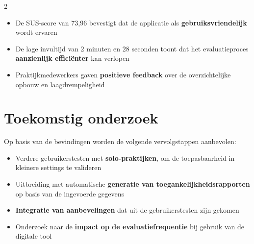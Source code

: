 \documentclass[a0,portrait]{hogent-poster}
\begin{document}
\begin{multicols}{2}
\begin{itemize}
  \item De SUS-score van 73,96 bevestigt dat de applicatie als \textbf{gebruiksvriendelijk} wordt ervaren
  \item De lage invultijd van 2 minuten en 28 seconden toont dat het evaluatieproces \textbf{aanzienlijk efficiënter} kan verlopen
  \item Praktijkmedewerkers gaven \textbf{positieve feedback} over de overzichtelijke opbouw en laagdrempeligheid
\end{itemize}

\section{Toekomstig onderzoek}

Op basis van de bevindingen worden de volgende vervolgstappen aanbevolen:
 
\begin{itemize}
  \item Verdere gebruikerstesten met \textbf{solo-praktijken}, om de toepasbaarheid in kleinere settings te valideren
  \item Uitbreiding met automatische \textbf{generatie van toegankelijkheidsrapporten} op basis van de ingevoerde gegevens
  \item \textbf{Integratie van aanbevelingen} dat uit de gebruikerstesten zijn gekomen
  \item Onderzoek naar de \textbf{impact op de evaluatiefrequentie} bij gebruik van de digitale tool
\end{itemize}

\end{multicols}
\end{document}
